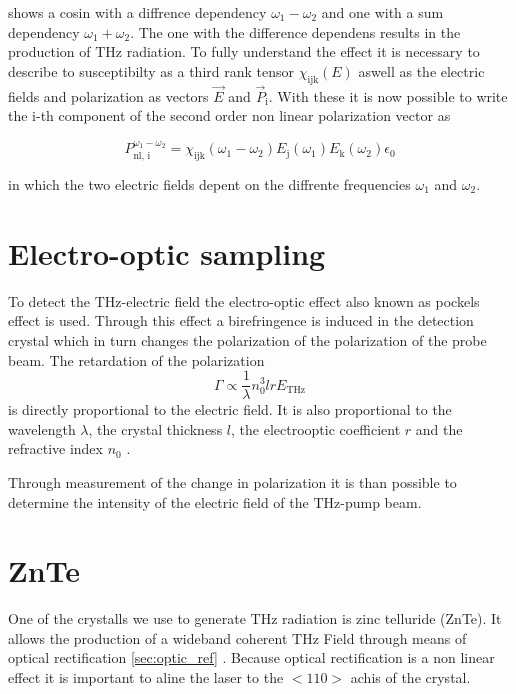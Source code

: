 shows a cosin with a diffrence dependency $\omega_1-\omega_2$ and one with a sum dependency $\omega_1+\omega_2$.
The one with the difference dependens results in the production of $\si{\tera\hertz}$ radiation. %
To fully understand the effect it is necessary to describe to susceptibilty as a third rank tensor $\chi_\text{ijk}(E)$ aswell as the electric fields and polarization as vectors $\vec{E}$ and $\vec{P}_\text{i}$.
With these it is now possible to write the $\text{i}$-th component of the second order non linear polarization vector as 

\begin{equation}
    P_\text{nl, i}^{\omega_1 - \omega_2} = \chi_\text{ijk}(\omega_1-\omega_2)E_\text{j}(\omega_1)E_\text{k}(\omega_2)\epsilon_0
    \label{eq:polarization_tensor_sus}
\end{equation}

in which the two electric fields depent on the diffrente frequencies $\omega_1$ and $\omega_2$.
% 

\cite[289--291]{book_optical_rectification}

\section{Electro-optic sampling}\label{sec:eos}
To detect the $\si{\tera\hertz}$-electric field the electro-optic effect also known as pockels effect is used.
Through this effect a birefringence is induced in the detection crystal which in turn changes the polarization of the polarization of the probe beam.
The retardation of the polarization 
\begin{equation}
    \Gamma \propto \frac{1}{\lambda} n_0^3 l r E_\text{THz}
\end{equation}
is directly proportional to the electric field. 
It is also proportional to the wavelength $\lambda$, the crystal thickness $l$, the electrooptic coefficient $r$ and the refractive index $n_0$ \cite{wiki_book}.  

Through measurement of the change in polarization it is than possible to determine the intensity of the electric field of the $\si{\tera\hertz}$-pump beam.


\section{ZnTe}
One of the crystalls we use to generate $\si{\tera\hertz}$ radiation is zinc telluride (ZnTe). 
It allows the production of a wideband coherent $\si{\tera\hertz}$ Field through means of optical rectification \ref{sec:optic_ref} \cite{ZnTe_Nahata_Weling_1996}.
Because optical rectification is a non linear effect it is important to aline the laser to the $<110>$ achis of the crystal.



